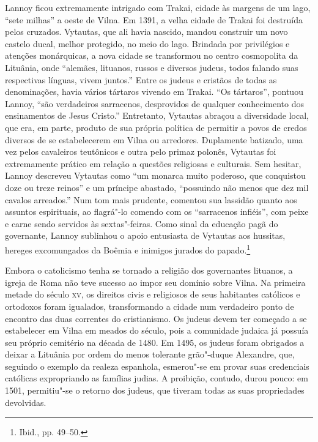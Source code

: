 Lannoy ficou extremamente intrigado com Trakai, cidade às margens de um
lago, ``sete milhas'' a oeste de Vilna. Em 1391, a velha cidade de
Trakai foi destruída pelos cruzados. Vytautas, que ali havia nascido,
mandou construir um novo castelo ducal, melhor protegido, no meio do
lago. Brindada por privilégios e atenções monárquicas, a nova cidade se
transformou no centro cosmopolita da Lituânia, onde ``alemães, lituanos,
russos e diversos judeus, todos falando suas respectivas línguas, vivem
juntos.'' Entre os judeus e cristãos de todas as denominações, havia
vários tártaros vivendo em Trakai. ``Os tártaros'', pontuou Lannoy,
``são verdadeiros sarracenos, desprovidos de qualquer conhecimento dos
ensinamentos de Jesus Cristo.'' Entretanto, Vytautas abraçou a
diversidade local, que era, em parte, produto de sua própria política de
permitir a povos de credos diversos de se estabelecerem em Vilna ou
arredores. Duplamente batizado, uma vez pelos cavaleiros teutônicos e
outra pelo primaz polonês, Vytautas foi extremamente prático em
relação a questões religiosas e culturais. Sem hesitar, Lannoy descreveu
Vytautas como ``um monarca muito poderoso, que conquistou doze ou treze
reinos'' e um príncipe abastado, ``possuindo não menos que dez mil
cavalos arreados.'' Num tom mais prudente, comentou sua lassidão quanto
aos assuntos espirituais, ao flagrá"-lo comendo com os ``sarracenos
infiéis'', com peixe e carne sendo servidos às sextas"-feiras. Como sinal
da educação pagã do governante, Lannoy sublinhou o apoio entusiasta de
Vytautas aos hussitas, hereges excomungados da Boêmia e inimigos jurados
do papado.\footnote{Ibid., pp. 49--50.}

\asterisc

Embora o catolicismo tenha se tornado a religião dos governantes
lituanos, a igreja de Roma não teve sucesso ao impor seu domínio sobre
Vilna. Na primeira metade do século \textsc{xv}, os direitos civis e religiosos
de seus habitantes católicos e ortodoxos foram igualados, transformando
a cidade num verdadeiro ponto de encontro das duas correntes do
cristianismo. Os judeus devem ter começado a se estabelecer em Vilna em
meados do século, pois a comunidade judaica já possuía seu próprio
cemitério na década de 1480. Em 1495, os judeus foram obrigados a deixar
a Lituânia por ordem do menos tolerante grão"-duque Alexandre, que,
seguindo o exemplo da realeza espanhola, esmerou"-se em provar suas
credenciais católicas expropriando as famílias judias. A proibição,
contudo, durou pouco: em 1501, permitiu"-se o retorno dos judeus, que
tiveram todas as suas propriedades devolvidas.

